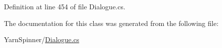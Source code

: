 Definition at line 454 of file Dialogue.\-cs.



The documentation for this class was generated from the following file\-:\begin{DoxyCompactItemize}
\item 
Yarn\-Spinner/\hyperlink{a00305}{Dialogue.\-cs}\end{DoxyCompactItemize}
